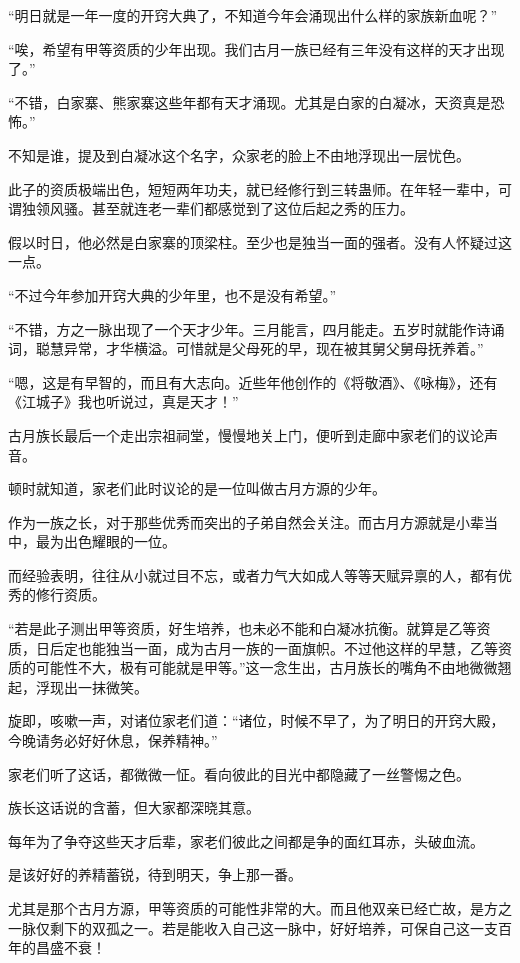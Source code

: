 \begin{this_body}
“明日就是一年一度的开窍大典了，不知道今年会涌现出什么样的家族新血呢？”

“唉，希望有甲等资质的少年出现。我们古月一族已经有三年没有这样的天才出现了。”

“不错，白家寨、熊家寨这些年都有天才涌现。尤其是白家的白凝冰，天资真是恐怖。”

不知是谁，提及到白凝冰这个名字，众家老的脸上不由地浮现出一层忧色。

此子的资质极端出色，短短两年功夫，就已经修行到三转蛊师。在年轻一辈中，可谓独领风骚。甚至就连老一辈们都感觉到了这位后起之秀的压力。

假以时日，他必然是白家寨的顶梁柱。至少也是独当一面的强者。没有人怀疑过这一点。

“不过今年参加开窍大典的少年里，也不是没有希望。”

“不错，方之一脉出现了一个天才少年。三月能言，四月能走。五岁时就能作诗诵词，聪慧异常，才华横溢。可惜就是父母死的早，现在被其舅父舅母抚养着。”

“嗯，这是有早智的，而且有大志向。近些年他创作的《将敬酒》、《咏梅》，还有《江城子》我也听说过，真是天才！”

古月族长最后一个走出宗祖祠堂，慢慢地关上门，便听到走廊中家老们的议论声音。

顿时就知道，家老们此时议论的是一位叫做古月方源的少年。

作为一族之长，对于那些优秀而突出的子弟自然会关注。而古月方源就是小辈当中，最为出色耀眼的一位。

而经验表明，往往从小就过目不忘，或者力气大如成人等等天赋异禀的人，都有优秀的修行资质。

“若是此子测出甲等资质，好生培养，也未必不能和白凝冰抗衡。就算是乙等资质，日后定也能独当一面，成为古月一族的一面旗帜。不过他这样的早慧，乙等资质的可能性不大，极有可能就是甲等。”这一念生出，古月族长的嘴角不由地微微翘起，浮现出一抹微笑。

旋即，咳嗽一声，对诸位家老们道：“诸位，时候不早了，为了明日的开窍大殿，今晚请务必好好休息，保养精神。”

家老们听了这话，都微微一怔。看向彼此的目光中都隐藏了一丝警惕之色。

族长这话说的含蓄，但大家都深晓其意。

每年为了争夺这些天才后辈，家老们彼此之间都是争的面红耳赤，头破血流。

是该好好的养精蓄锐，待到明天，争上那一番。

尤其是那个古月方源，甲等资质的可能性非常的大。而且他双亲已经亡故，是方之一脉仅剩下的双孤之一。若是能收入自己这一脉中，好好培养，可保自己这一支百年的昌盛不衰！


\end{this_body}
